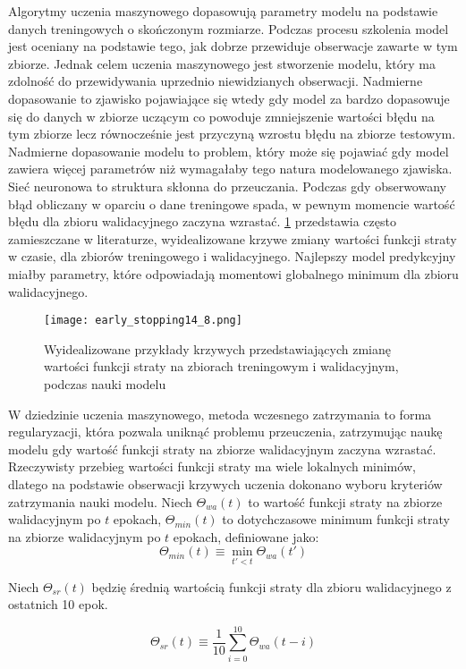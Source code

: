 \documentclass[11pt]{book}
\theoremstyle{definition}
\begin{document}
Algorytmy uczenia maszynowego dopasowują parametry modelu na podstawie danych treningowych o skończonym rozmiarze. Podczas procesu szkolenia model jest oceniany na podstawie tego, jak dobrze przewiduje obserwacje zawarte w tym zbiorze. Jednak celem uczenia maszynowego jest stworzenie modelu, który ma zdolność do przewidywania uprzednio niewidzianych obserwacji. Nadmierne dopasowanie to zjawisko pojawiające się wtedy gdy model za bardzo dopasowuje się do danych w zbiorze uczącym co powoduje zmniejszenie wartości błędu na tym zbiorze lecz równocześnie jest przyczyną wzrostu błędu na zbiorze testowym. Nadmierne dopasowanie modelu to problem, który może się pojawiać gdy model zawiera więcej parametrów niż wymagałaby tego natura modelowanego zjawiska. Sieć neuronowa to struktura skłonna do przeuczania. Podczas gdy obserwowany błąd obliczany w oparciu o dane treningowe spada, w pewnym momencie wartość błędu dla zbioru walidacyjnego zaczyna wzrastać. \figurename{} \ref{fig:loss_curves} przedstawia często zamieszczane w literaturze, wyidealizowane krzywe zmiany wartości funkcji straty w czasie, dla zbiorów treningowego i walidacyjnego. Najlepszy model predykcyjny miałby parametry, które odpowiadają momentowi globalnego minimum dla zbioru walidacyjnego.


\begin{figure}[htp!]
	\centering
	\texttt{[image: early\_stopping14\_8.png]}
	\caption{Wyidealizowane przykłady krzywych przedstawiających zmianę wartości funkcji straty na zbiorach treningowym i walidacyjnym, podczas nauki modelu}
	\label{fig:loss_curves}
\end{figure}

W dziedzinie uczenia maszynowego, metoda wczesnego zatrzymania to forma regularyzacji, która pozwala uniknąć problemu przeuczenia, zatrzymując naukę modelu gdy wartość funkcji straty na zbiorze walidacyjnym zaczyna wzrastać. Rzeczywisty przebieg wartości funkcji straty ma wiele lokalnych minimów, dlatego na podstawie obserwacji krzywych uczenia dokonano wyboru kryteriów zatrzymania nauki modelu. 
Niech $\Theta_{wa}(t)$ to wartość funkcji straty na zbiorze walidacyjnym po $t$ epokach, $\Theta_{min}(t)$ to dotychczasowe minimum funkcji straty na zbiorze walidacyjnym po $t$ epokach, definiowane jako:
$$
\Theta_{min}(t) \equiv \min_{t' < t} \Theta_{wa}(t')
$$

Niech $\Theta_{sr}(t)$ będzię średnią wartością funkcji straty dla zbioru walidacyjnego z ostatnich 10 epok.

$$
\Theta_{sr}(t) \equiv \frac{1}{10} \sum_{i=0}^{10} \Theta_{wa}(t-i)
$$
\end{document}
